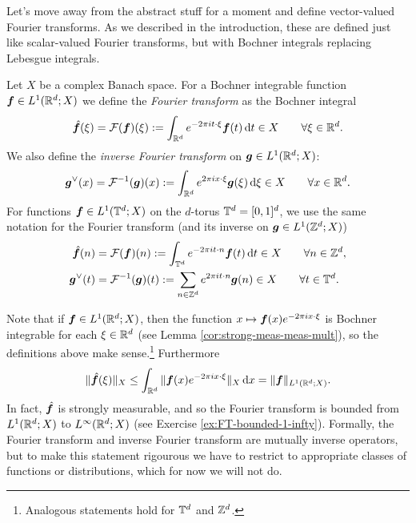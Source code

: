 Let's move away from the abstract stuff for a moment and define vector-valued Fourier transforms.
As we described in the introduction, these are defined just like scalar-valued Fourier transforms, but with Bochner integrals replacing Lebesgue integrals.

\begin{defn}
  Let $X$ be a complex Banach space.
  For a Bochner integrable function $\bm{f} \in L^1(\mathbb{R}^d;X)$ we define the \emph{Fourier transform} as the Bochner integral
  \begin{equation*}
    \hat{\bm{f}}(\xi) = \mathcal{F}(\bm{f})(\xi) := \int_{\mathbb{R}^d} e^{-2\pi i t \cdot \xi} \bm{f}(t)  \, \mathrm{d} t \in X \qquad \forall \xi \in \mathbb{R}^d. 
  \end{equation*}
  We also define the \emph{inverse Fourier transform} on $\bm{g} \in L^1(\mathbb{R}^d;X)$:
  \begin{equation*}
    \bm{g}^{\vee}(x) = \mathcal{F}^{-1}(\bm{g})(x) := \int_{\mathbb{R}^d} e^{2\pi i x \cdot \xi} \bm{g}(\xi) \, \mathrm{d} \xi \in X \qquad \forall x \in \mathbb{R}^d.
  \end{equation*}
  For functions $\bm{f} \in L^1(\mathbb{T}^d ; X)$ on the $d$-torus $\mathbb{T}^d = [0,1]^d$, we use the same notation for the Fourier transform (and its inverse on $\bm{g} \in L^1(\mathbb{Z}^d; X)$)
  \begin{equation*}
    \begin{aligned}
      \hat{\bm{f}}(n) &= \mathcal{F}(\bm{f})(n) := \int_{\mathbb{T}^d} e^{-2\pi i t \cdot n} \bm{f}(t)  \, \mathrm{d} t \in X \qquad \forall n \in \mathbb{Z}^d, \\
      \bm{g}^{\vee}(t) &= \mathcal{F}^{-1}(\bm{g})(t) := \sum_{n \in \mathbb{Z}^d} e^{2\pi i t \cdot n}  \bm{g}(n) \in X \qquad \forall t \in \mathbb{T}^d.
    \end{aligned}
  \end{equation*}
\end{defn}

Note that if $\bm{f} \in L^1(\mathbb{R}^d;X)$, then the function $x \mapsto \bm{f}(x)e^{-2\pi i x \cdot \xi}$ is Bochner integrable for each $\xi \in \mathbb{R}^d$ (see Lemma \ref{cor:strong-meas-meas-mult}), so the definitions above make sense.\footnote{Analogous statements hold for $\mathbb{T}^d$ and $\mathbb{Z}^d$.}
Furthermore
\begin{equation*}
  \|\hat{\bm{f}}(\xi)\|_X \leq \int_{\mathbb{R}^d} \| \bm{f}(x) e^{-2\pi i x \cdot \xi} \|_X \, \mathrm{d} x = \|\bm{f}\|_{L^1(\mathbb{R}^d;X)}.
\end{equation*}
In fact, $\hat{\bm{f}}$ is strongly measurable, and so the Fourier transform is bounded from $L^1(\mathbb{R}^d;X)$ to $L^\infty(\mathbb{R}^d;X)$ (see Exercise \ref{ex:FT-bounded-1-infty}).
Formally, the Fourier transform and inverse Fourier transform are mutually inverse operators, but to make this statement rigourous we have to restrict to appropriate classes of functions or distributions, which for now we will not do.

